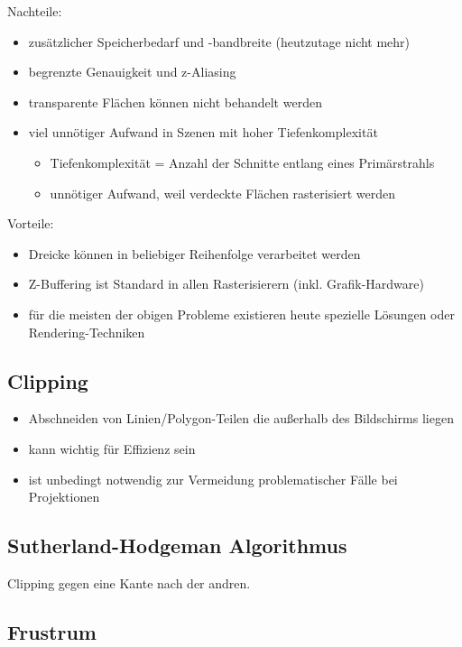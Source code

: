 \documentclass[paper=a4, fontsize=11pt]{scrartcl} %
\numberwithin{equation}{section} %
\numberwithin{figure}{section} %
\numberwithin{table}{section} %
\begin{document}
Nachteile:
\begin{itemize}
\item zusätzlicher Speicherbedarf und -bandbreite (heutzutage nicht mehr)
\item begrenzte Genauigkeit und z-Aliasing
\item transparente Flächen können nicht behandelt werden
\item viel unnötiger Aufwand in Szenen mit hoher Tiefenkomplexität
\begin{itemize}
\item Tiefenkomplexität = Anzahl der Schnitte entlang eines Primärstrahls
\item unnötiger Aufwand, weil verdeckte Flächen rasterisiert werden
\end{itemize}
\end{itemize}

Vorteile:
\begin{itemize}
\item Dreicke können in beliebiger Reihenfolge verarbeitet werden
\item Z-Buffering ist Standard in allen Rasterisierern (inkl. Grafik-Hardware)
\item für die meisten der obigen Probleme existieren heute spezielle Lösungen oder Rendering-Techniken
\end{itemize}

\subsection{Clipping}

\begin{itemize}
\item Abschneiden von Linien/Polygon-Teilen die außerhalb des Bildschirms liegen
\item kann wichtig für Effizienz sein
\item ist unbedingt notwendig zur Vermeidung problematischer Fälle bei Projektionen
\end{itemize}

\subsection{Sutherland-Hodgeman Algorithmus}

Clipping gegen eine Kante nach der andren.

\subsection{Frustrum}
\end{document}
